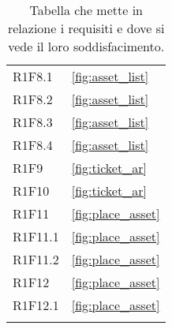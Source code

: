 {\begin{longtable}{C{.3\freewidth} C{.4\freewidth}}
    R1F8.1 & \ref{fig:asset_list}\\
    R1F8.2 & \ref{fig:asset_list}\\
    R1F8.3 &\ref{fig:asset_list}\\
    R1F8.4 & \ref{fig:asset_list}\\
    R1F9 & \ref{fig:ticket_ar}\\
    R1F10 &\ref{fig:ticket_ar}\\ 
    R1F11 &\ref{fig:place_asset} \\
    R1F11.1 & \ref{fig:place_asset}\\
    R1F11.2 & \ref{fig:place_asset}\\
    R1F12 & \ref{fig:place_asset}\\
    R1F12.1 & \ref{fig:place_asset}\\
    
    \bottomrule
    \caption[Tabella requisiti-chi li soddisfa]{Tabella che mette in relazione i requisiti e dove si vede il loro soddisfacimento.}
    \end{longtable}
}

